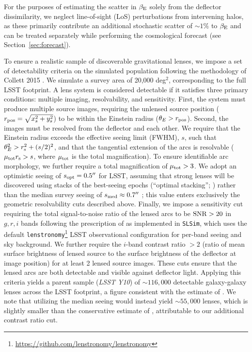 \documentclass[a4paper,11pt]{article}
\begin{document}
For the purposes of estimating the scatter in $\beta_{\rm E}$ solely from the deflector dissimilarity, we neglect line-of-sight (LoS) perturbations from intervening halos, as these primarily contribute an additional stochastic scatter of $\sim 1\%$ to $\beta_{\rm E}$ and can be treated separately \cite{Johnson:2025} while performing the cosmological forecast (see Section~\ref{sec:forecast}).

To ensure a realistic sample of discoverable gravitational lenses, we impose a set of detectability criteria on the simulated population following the methodology of Collett 2015 \cite[Eq. 6-9]{Collett:2015}. We simulate a survey area of 20,000 deg$^2$, corresponding to the full LSST footprint. A lens system is considered detectable if it satisfies three primary conditions: multiple imaging, resolvability, and sensitivity. First, the system must produce multiple source images, requiring the unlensed source position ($r_{\rm pos} = \sqrt{x_s^2 + y_s^2}$) to be within the Einstein radius ($\theta_E > r_{\rm pos}$). Second, the images must be resolved from the deflector and each other. We require that the Einstein radius exceeds the effective seeing limit (FWHM), $s$, such that $\theta_E^2 > r_{\rm s}^2 + (s/2)^2$, and that the tangential extension of the arcs is resolvable ($\mu_{\rm tot} r_{\rm s} > s$, where $\mu_{\rm tot}$ is the total magnification). To ensure identifiable arc morphology, we further require a total magnification of $\mu_{\rm tot} > 3$. 
We adopt an optimistic seeing of $s_{\rm opt} = 0.5''$ for LSST, assuming that strong lenses will be discovered using stacks of the best-seeing epochs (``optimal stacking''; \cite{Collett:2015}) rather than the median survey seeing of $s_{\rm med} \approx 0.7''$ \cite{LSSTScienceBook:2009}; this value enters exclusively the geometric resolvability cuts described above. Finally, we impose a sensitivity cut requiring the total signal-to-noise ratio of the lensed arcs to be ${\rm SNR} > 20$ in $g, r, i$ bands following the prescription of \cite{Holloway:2023} as implemented in \texttt{SLSim}, which uses the default \texttt{lenstronomy}\footnote{\href{https://github.com/lenstronomy/lenstronomy}{https://github.com/lenstronomy/lenstronomy}}\cite{Birrer:2018, Birrer:2021} LSST observational configuration for per-band seeing and sky background. We further require the $i$-band contrast ratio $> 2$ (ratio of mean surface brightness of lensed source to the surface brightness of the deflector at image position) for at least 2 lensed source images. These cuts ensure that the lensed arcs are both detectable and visible against deflector light. Applying this criteria yields a parent sample (\emph{LSST Y10}) of $\sim 116,000$ detectable galaxy-galaxy lenses across the LSST footprint, a figure consistent with the estimate of \cite{Collett:2015}. We note that utilizing the median seeing would instead yield $\sim 55,000$ lenses, which is slightly smaller than the conservative estimate of \cite{Collett:2015}, attributable to our additional contrast ratio cut. 
\end{document}
